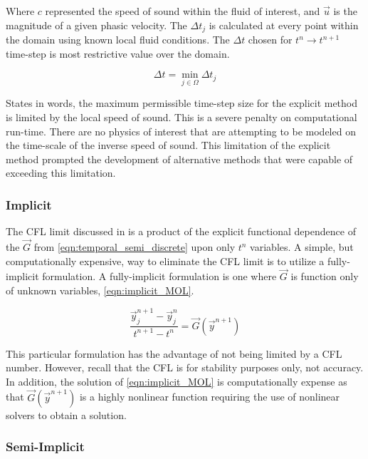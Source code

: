 Where $c$ represented the speed of sound within the fluid of interest, and $\vec{u}$ is the magnitude of a given phasic velocity.
The $\Delta t_j$ is calculated at every point within the domain using known local fluid conditions.
The $\Delta t$ chosen for $t^{n} \rightarrow t^{n+1}$ time-step is most restrictive value over the domain.

\begin{equation}
\label{eqn:global_cfl}
\Delta t = \min_{j \in \Omega} \Delta t_j
\end{equation}

States in words, the maximum permissible time-step size for the explicit method is limited by the local speed of sound.
This is a severe penalty on computational run-time.
There are no physics of interest that are attempting to be modeled on the time-scale of the inverse speed of sound.
This limitation of the explicit method prompted the development of alternative methods that were capable of exceeding this limitation.

\subsubsection{Implicit}
\label{subsubsect:numerics_fully_implicit}
The CFL limit discussed in  is a product of the explicit functional dependence of the $\vec{G}$ from \eqref{eqn:temporal_semi_discrete} upon only $t^n$ variables.
A simple, but computationally expensive, way to eliminate the CFL limit is to utilize a fully-implicit formulation.
A fully-implicit formulation is one where $\vec{G}$ is function only of unknown variables, \eqref{eqn:implicit_MOL}.

\begin{equation}
\label{eqn:implicit_MOL}
\frac{ \vec{y}^{n+1}_{j} - \vec{y}^{n}_{j}}{t^{n+1}-t^{n}} = \vec{G}(\vec{y}^{n+1})
\end{equation}

This particular formulation has the advantage of not being limited by a CFL number.
However, recall that the CFL is for stability purposes only, not accuracy.
In addition, the solution of \eqref{eqn:implicit_MOL} is computationally expense as that $\vec{G}(\vec{y}^{n+1})$ is a highly nonlinear function requiring the use of nonlinear solvers to obtain a solution.

\subsubsection{Semi-Implicit}
\label{subsubsect:temporal_semi_implicit}

